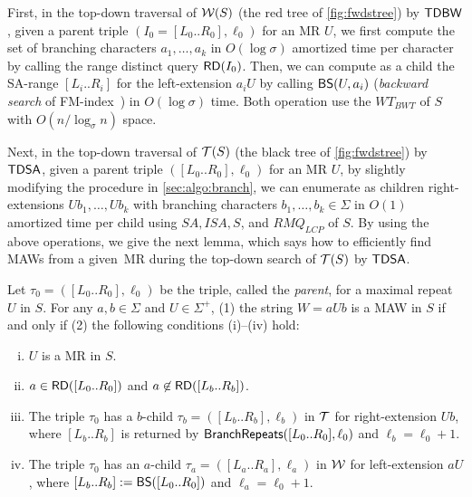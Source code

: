 First, in the top-down traversal of $\mathcal{W}(S)$ (the red tree of \cref{fig:fwdstree}) by $\textsf{TDBW}$, given a parent triple $(I_0 = [L_0..R_0], \ell_0)$ for an MR $U$, we first compute the set of branching characters $a_1, \dots, a_k$ in $O(\log\sigma)$ amortized time per character by calling the range distinct query $\mbox{\textsf{RD}}(I_0)$. Then, we can compute as a child the SA-range $[L_i..R_i]$ for the left-extension $a_i U$ by calling $\mbox{\textsf{BS}}(U, a_i)$ (\textit{backward search} of FM-index~\cite{Ferragina05:FM}) in $O(\log\sigma)$ time. Both operation use the $WT_{BWT}$ of $S$ with $O(n/\log_\sigma n)$ space. 

Next, in the top-down traversal of $\mathcal{T}(S)$ (the black tree of \cref{fig:fwdstree}) by $\textsf{TDSA}$, given a parent triple $([L_0..R_0], \ell_0)$ for an MR $U$, by slightly modifying the procedure  in \cref{sec:algo:branch}, we can enumerate as children right-extensions $U b_1, \dots, U b_k$ with branching characters $b_1, \dots, b_k \in \Sigma$ in $O(1)$ amortized time per child using $SA, ISA, S$, and $RMQ_{LCP}$ of $S$.
By using the above operations, we give the next lemma, which says how to efficiently find MAWs from a given~MR during the top-down search of $\mathcal{T}(S)$ by $\textsf{TDSA}$. 


\begin{lemma}\label{lem:maw:character:proc}
  Let $\tau_0 = ([L_0..R_0], \ell_0)$ be the triple, called the \textit{parent}, for a maximal repeat $U$ in $S$. For any $a,b \in \Sigma$ and $U\in \Sigma^+$, (1) the string $W = aUb$ is a MAW in $S$ if and only if (2) the following conditions (i)--(iv) hold: 
    \begin{enumerate}[(i)]
    \item $U$ is a MR in $S$.
      
    \item $a \in \mbox{\textsf{RD}}([L_0..R_0])$ and $a \not\in \mbox{\textsf{RD}}([L_b..R_b])$. 
    \item The triple $\tau_0$ has a $b$-child $\tau_b = ([L_b..R_b], \ell_b)$ in $\mathcal{T}$ for right-extension $Ub$, where $[L_b..R_b]$ is returned by $\mbox{\textsf{BranchRepeats}}([L_0..R_0], \ell_0)$ and $\ell_b = \ell_0 + 1$. 

    \item The triple $\tau_0$ has an $a$-child $\tau_a = ([L_a..R_a], \ell_a)$ in $\mathcal{W}$ for left-extension $aU$,
      where $[L_b..R_b] := \mbox{\textsf{BS}}([L_0..R_0])$ and $\ell_a = \ell_0 + 1$. 
    \end{enumerate}
\end{lemma}

